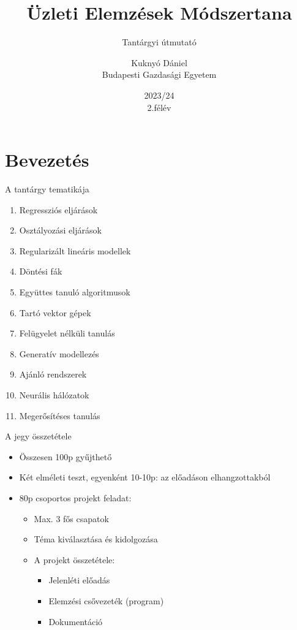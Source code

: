 \documentclass[english, aspectratio=169]{beamer}
\newcommand\makebeamertitle{\frame{\maketitle}}
\begin{document}
\section{Bevezetés}
\title[]{Üzleti Elemzések Módszertana}
\subtitle{Tantárgyi útmutató}
\author[Kuknyó Dániel]{Kuknyó Dániel\\Budapesti Gazdasági Egyetem}
\date{2023/24\\2.félév}
\makebeamertitle

\begin{frame}{A tantárgy tematikája}
\begin{enumerate}
	\item Regressziós eljárások
	\item Osztályozási eljárások
	\item Regularizált lineáris modellek
	\item Döntési fák
	\item Együttes tanuló algoritmusok
	\item Tartó vektor gépek
	\item Felügyelet nélküli tanulás
	\item Generatív modellezés
	\item Ajánló rendszerek
	\item Neurális hálózatok 
	\item Megerősítéses tanulás
\end{enumerate}
\end{frame}

\begin{frame}{A jegy összetétele}
\begin{itemize}
	\item Összesen 100p gyűjthető
	\item Két elméleti teszt, egyenként 10-10p: az előadáson elhangzottakból
	\item 80p csoportos projekt feladat:
	\begin{itemize}
		\item Max. 3 fős csapatok
		\item Téma kiválasztása és kidolgozása
		\item A projekt összetétele:
		\begin{itemize}
			\item Jelenléti előadás
			\item Elemzési csővezeték (program)
			\item Dokumentáció
		\end{itemize}
	\end{itemize}
\end{itemize}
\end{frame}
\end{document}
